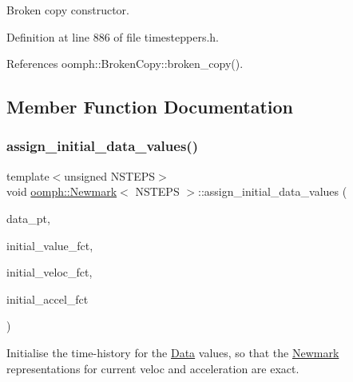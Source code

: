 Broken copy constructor. 



Definition at line 886 of file timesteppers.\+h.



References oomph\+::\+Broken\+Copy\+::broken\+\_\+copy().



\subsection{Member Function Documentation}
\mbox{\label{classoomph_1_1Newmark_ab5d5983bf3c821d738c429e24f157f05}} 
\subsubsection{\texorpdfstring{assign\+\_\+initial\+\_\+data\+\_\+values()}{assign\_initial\_data\_values()}\hspace{0.1cm}{\footnotesize\ttfamily [1/2]}}
{\footnotesize\ttfamily template$<$unsigned N\+S\+T\+E\+PS$>$ \\
void \hyperlink{classoomph_1_1Newmark}{oomph\+::\+Newmark}$<$ N\+S\+T\+E\+PS $>$\+::assign\+\_\+initial\+\_\+data\+\_\+values (\begin{DoxyParamCaption}\item[{\hyperlink{classoomph_1_1Data}{Data} $\ast$const \&}]{data\+\_\+pt,  }\item[{\hyperlink{classoomph_1_1Vector}{Vector}$<$ \hyperlink{classoomph_1_1Newmark_a40793f69efc56441a46296ad428dc3d4}{Initial\+Condition\+Fct\+Pt} $>$}]{initial\+\_\+value\+\_\+fct,  }\item[{\hyperlink{classoomph_1_1Vector}{Vector}$<$ \hyperlink{classoomph_1_1Newmark_a40793f69efc56441a46296ad428dc3d4}{Initial\+Condition\+Fct\+Pt} $>$}]{initial\+\_\+veloc\+\_\+fct,  }\item[{\hyperlink{classoomph_1_1Vector}{Vector}$<$ \hyperlink{classoomph_1_1Newmark_a40793f69efc56441a46296ad428dc3d4}{Initial\+Condition\+Fct\+Pt} $>$}]{initial\+\_\+accel\+\_\+fct }\end{DoxyParamCaption})}



Initialise the time-\/history for the \hyperlink{classoomph_1_1Data}{Data} values, so that the \hyperlink{classoomph_1_1Newmark}{Newmark} representations for current veloc and acceleration are exact. 



